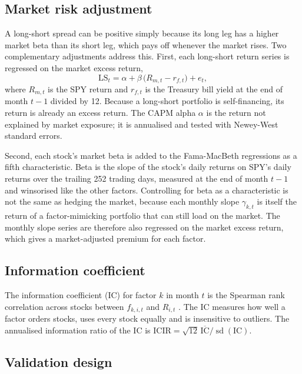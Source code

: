\documentclass[11pt,a4paper]{article}
\begin{document}
\subsection{Market risk adjustment}

A long-short spread can be positive simply because its long leg has a higher market beta than its short leg, which pays off whenever the market rises. Two complementary adjustments address this. First, each long-short return series is regressed on the market excess return,
\begin{equation}
\text{LS}_{t} = \alpha + \beta\,\big(R_{m,t} - r_{f,t}\big) + e_t ,
\end{equation}
where $R_{m,t}$ is the SPY return and $r_{f,t}$ is the Treasury bill yield at the end of month $t-1$ divided by 12. Because a long-short portfolio is self-financing, its return is already an excess return. The CAPM alpha $\alpha$ \citep{sharpe1964} is the return not explained by market exposure; it is annualised and tested with Newey-West standard errors.

Second, each stock's market beta is added to the Fama-MacBeth regressions as a fifth characteristic. Beta is the slope of the stock's daily returns on SPY's daily returns over the trailing 252 trading days, measured at the end of month $t-1$ and winsorised like the other factors. Controlling for beta as a characteristic is not the same as hedging the market, because each monthly slope $\gamma_{k,t}$ is itself the return of a factor-mimicking portfolio that can still load on the market. The monthly slope series are therefore also regressed on the market excess return, which gives a market-adjusted premium for each factor.

\subsection{Information coefficient}

The information coefficient (IC) for factor $k$ in month $t$ is the Spearman rank correlation across stocks between $f_{k,i,t}$ and $R_{i,t}$ \citep{grinold2000}. The IC measures how well a factor orders stocks, uses every stock equally and is insensitive to outliers. The annualised information ratio of the IC is $\text{ICIR} = \sqrt{12}\,\overline{\text{IC}}/\operatorname{sd}(\text{IC})$.

\subsection{Validation design}
\end{document}
